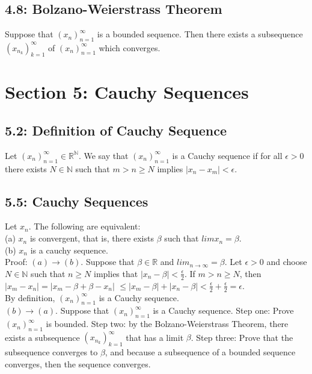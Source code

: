 \documentclass[10pt,letter]{report}
\begin{document}
\section*{4.8: Bolzano-Weierstrass Theorem}
Suppose that $(x_n)_{n=1}^\infty$ is a bounded sequence. Then there exists a subsequence $(x_{n_k})_{k=1}^\infty$ of $(x_n)_{n=1}^\infty$ which converges.



\chapter*{Section 5: Cauchy Sequences}

\section*{5.2: Definition of Cauchy Sequence}
Let $(x_n)_{n=1}^\infty\in\mathbb{R}^\mathbb{N}$. We say that $(x_n)_{n=1}^\infty$ is a Cauchy sequence if for all $\epsilon > 0$ there exists $N\in\mathbb{N}$ such that $m > n \geq N$ implies $|x_n - x_m| < \epsilon$. 

\section*{5.5: Cauchy Sequences}
Let $x_n$. The following are equivalent: \\ 
(a) $x_n$ is convergent, that is, there exists $\beta$ such that $lim x_n = \beta$.\\ 
(b) $x_n$ is a cauchy sequence. \\ 
Proof: $(a) \rightarrow (b)$. Suppose that $\beta \in \mathbb{R}$ and $lim_{n\rightarrow\infty} = \beta$. Let $\epsilon > 0$ and choose $N \in \mathbb{N}$ such that $n \geq N$ implies that $|x_n - \beta| < \frac{\epsilon}{2}$. If $m > n \geq N$, then \\ 
$|x_m - x_n| = |x_m - \beta + \beta - x_n|$
$\leq |x_m - \beta| + |x_n - \beta| < \frac{\epsilon}{2} + \frac{\epsilon}{2} = \epsilon$. \\ 
By definition, $(x_n)_{n=1}^\infty$ is a Cauchy sequence. \\ 

$(b)\rightarrow(a)$. Suppose that $(x_n)_{n=1}^\infty$ is a Cauchy sequence. Step one: Prove $(x_n)_{n=1}^\infty$ is bounded. Step two: by the Bolzano-Weierstrass Theorem, there exists a subsequence $(x_{n_k})_{k=1}^\infty$ that has a limit $\beta$. Step three: Prove that the subsequence converges to $\beta$, and because a subsequence of a bounded sequence converges, then the sequence converges. 
\end{document}
